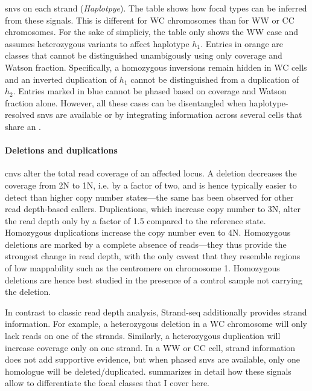 \begin{table}[t]
{    \acp{snv} on each strand (\emph{Haplotpye}). The table shows how
    focal \sv types can be inferred from these signals. This is different
    for WC chromosomes than for WW or CC chromosomes. For the sake of simpliciy,
    the table only shows the WW case and assumes heterozygous variants to affect
    haplotype $h_1$. Entries in orange are \sv classes that cannot be
    distinguished unambigously using only coverage and Watson fraction.
    Specifically, a homozygous inversions remain hidden in WC cells and an
    inverted duplication of $h_1$ cannot be distinguished from a duplication of
    $h_2$. Entries marked in blue cannot be phased based on coverage and Watson
    fraction alone. However, all these cases can be disentangled when
    haplotype-resolved \acp{snv} are available or by integrating information
    across several cells that share an \sv.}
\end{table}

\paragraph{Deletions and duplications}
\Acp{cnv} alter the total read coverage of an affected locus. A deletion
decreases the coverage from 2N to 1N, i.e. by a factor of two, and is hence
typically easier to detect than higher copy number states---the same has been observed for other read
depth-based \sv callers. Duplications, which increase copy number to 3N, alter
the read depth only by a factor of 1.5 compared to the reference state.
Homozygous duplications increase the copy number even to 4N. Homozygous
deletions are marked by a complete absence of reads---they thus provide the
strongest change in read depth, with the only caveat that they resemble regions
of low mappability such as the centromere on chromosome 1. Homozygous deletions
are hence best studied in the presence of a control sample not carrying
the deletion.

In contrast to classic read depth analysis, Strand-seq additionally provides
strand information. For example, a heterozygous deletion in a WC chromosome will
only lack reads on one of the strands. Similarly, a heterozygous duplication
will increase coverage only on one strand. In a WW or CC cell, strand
information does not add supportive evidence, but when phased \acp{snv} are
available, only one homologue will be deleted/duplicated.
 summarizes in detail how these signals
allow to differentiate the focal \sv classes that I cover here.


